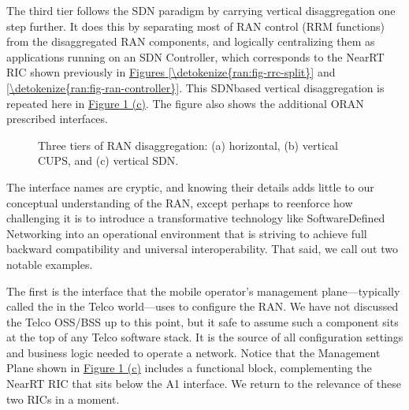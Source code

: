 \documentclass[a4paper,11pt,english]{sphinxmanual}
\let\sphinxpxdimen\pdfpxdimen\else\newdimen\sphinxpxdimen
\begin{document}
\sphinxAtStartPar
The third tier follows the SDN paradigm by carrying vertical
disaggregation one step further. It does this by separating most of
RAN control (RRM functions) from the disaggregated RAN components, and
logically centralizing them as applications running on an SDN
Controller, which corresponds to the Near\sphinxhyphen{}RT RIC shown previously in
\hyperref[\detokenize{ran:fig-rrc-split}]{Figures \ref{\detokenize{ran:fig-rrc-split}}} and \hyperref[\detokenize{ran:fig-ran-controller}]{\ref{\detokenize{ran:fig-ran-controller}}}. This SDN\sphinxhyphen{}based vertical disaggregation is
repeated here in \hyperref[\detokenize{ran:fig-disagg}]{Figure \ref{\detokenize{ran:fig-disagg}} (c)}.  The figure
also shows the additional O\sphinxhyphen{}RAN prescribed interfaces.

\begin{figure}[ht]
\centering
\capstart

\noindent\sphinxincludegraphics[width=450\sphinxpxdimen]{{Slide39}.png}
\caption{Three tiers of RAN disaggregation: (a) horizontal, (b) vertical
CUPS, and (c) vertical SDN.}\label{\detokenize{ran:id6}}\label{\detokenize{ran:fig-disagg}}\end{figure}

\sphinxAtStartPar
The interface names are cryptic, and knowing their details adds little
to our conceptual understanding of the RAN, except perhaps to
re\sphinxhyphen{}enforce how challenging it is to introduce a transformative
technology like Software\sphinxhyphen{}Defined Networking into an operational
environment that is striving to achieve full backward compatibility
and universal interoperability. That said, we call out two notable
examples.

\sphinxAtStartPar
The first is the  interface that the mobile operator’s
management plane—typically called the  in the Telco world—uses to
configure the RAN.  We have not discussed the Telco OSS/BSS up to this
point, but it safe to assume such a component sits at the top of any
Telco software stack. It is the source of all configuration settings
and business logic needed to operate a network. Notice that the
Management Plane shown in \hyperref[\detokenize{ran:fig-disagg}]{Figure \ref{\detokenize{ran:fig-disagg}} (c)}
includes a  functional block, complementing the
Near\sphinxhyphen{}RT RIC that sits below the A1 interface. We return to the
relevance of these two RICs in a moment.
\end{document}
